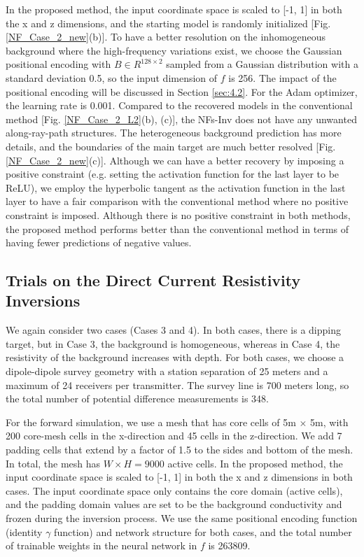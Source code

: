 \documentclass[lettersize,journal]{IEEEtran}
\begin{document}
In the proposed method, the input coordinate space is scaled to [-1, 1] in both the x and z dimensions, and the starting model is randomly initialized [Fig. \ref{NF_Case_2_new}(b)]. To have a better resolution on the inhomogeneous background where the high-frequency variations exist, we choose the Gaussian positional encoding with $B \in R^{128\times 2}$ sampled from a Gaussian distribution with a standard deviation 0.5, so the input dimension of $f$ is 256. The impact of the positional encoding will be discussed in Section \ref{sec:4.2}. For the Adam optimizer, the learning rate is 0.001. Compared to the recovered models in the conventional method [Fig. \ref{NF_Case_2_L2}(b), (c)], the NFs-Inv does not have any unwanted along-ray-path structures. The heterogeneous background prediction has more details, and the boundaries of the main target are much better resolved [Fig. \ref{NF_Case_2_new}(c)]. Although we can have a better recovery by imposing a positive constraint (e.g. setting the activation function for the last layer to be ReLU), we employ the hyperbolic tangent as the activation function in the last layer to have a fair comparison with the conventional method where no positive constraint is imposed. Although there is no positive constraint in both methods, the proposed method performs better than the conventional method in terms of having fewer predictions of negative values.

\subsection{Trials on the Direct Current Resistivity Inversions}
\label{sec:3.2}

We again consider two cases (Cases 3 and 4). In both cases, there is a dipping target, but in Case 3, the background is homogeneous, whereas in Case 4, the resistivity of the background increases with depth. For both cases, we choose a dipole-dipole survey geometry with a station separation of 25 meters and a maximum of 24 receivers per transmitter. The survey line is 700 meters long, so the total number of potential difference measurements is 348. 

For the forward simulation, we use a mesh that has core cells of 5m $\times$ 5m, with 200 core-mesh cells in the x-direction and 45 cells in the z-direction. We add 7 padding cells that extend by a factor of 1.5 to the sides and bottom of the mesh. In total, the mesh has $W\times H = 9000$ active cells. In the proposed method, the input coordinate space is scaled to [-1, 1] in both the x and z dimensions in both cases. The input coordinate space only contains the core domain (active cells), and the padding domain values are set to be the background conductivity and frozen during the inversion process. We use the same positional encoding function (identity $\gamma$ function) and network structure for both cases, and the total number of trainable weights in the neural network in $f$ is 263809. 
\end{document}
